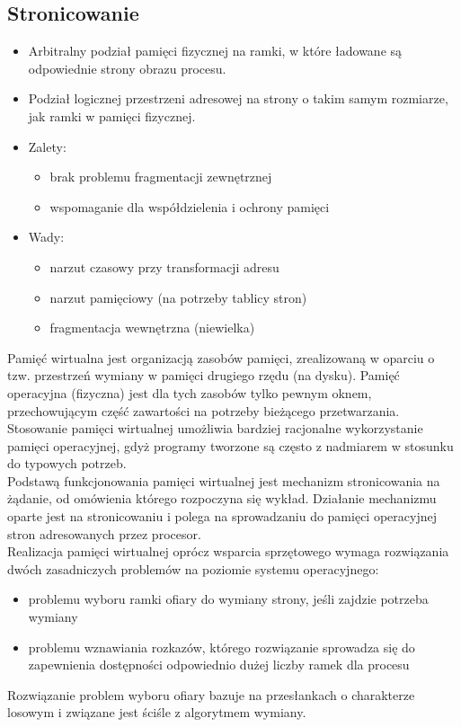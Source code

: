 \documentclass[main.tex]{subfiles}
\begin{document}
    \subsection{Stronicowanie}
    \begin{itemize}
        \item Arbitralny podział pamięci fizycznej na ramki, w które ładowane są odpowiednie strony obrazu procesu.
        \item Podział logicznej przestrzeni adresowej na strony o takim samym rozmiarze, jak ramki w pamięci fizycznej.
        \item Zalety:
        \begin{itemize}
            \item brak problemu fragmentacji zewnętrznej
            \item wspomaganie dla współdzielenia i ochrony pamięci
        \end{itemize}
        \item Wady:
        \begin{itemize}
            \item narzut czasowy przy transformacji adresu
            \item narzut pamięciowy (na potrzeby tablicy stron)
            \item fragmentacja wewnętrzna (niewielka)
        \end{itemize}
    \end{itemize}

    Pamięć wirtualna jest organizacją zasobów pamięci, zrealizowaną w oparciu o tzw. przestrzeń wymiany w pamięci drugiego rzędu (na dysku). Pamięć operacyjna (fizyczna) jest dla tych zasobów tylko pewnym oknem, przechowującym część zawartości na potrzeby bieżącego przetwarzania. Stosowanie pamięci wirtualnej umożliwia bardziej racjonalne wykorzystanie pamięci operacyjnej, gdyż programy tworzone są często z nadmiarem w stosunku do typowych potrzeb.
    \\
    Podstawą funkcjonowania pamięci wirtualnej jest mechanizm stronicowania na żądanie, od omówienia którego rozpoczyna się
    wykład. Działanie mechanizmu oparte jest na stronicowaniu i polega na sprowadzaniu do pamięci operacyjnej stron adresowanych przez procesor.
    \\
    Realizacja pamięci wirtualnej oprócz wsparcia sprzętowego
    wymaga rozwiązania dwóch zasadniczych problemów na poziomie systemu operacyjnego:
    \begin{itemize}
        \item problemu wyboru ramki ofiary do wymiany strony, jeśli zajdzie potrzeba wymiany
        \item problemu wznawiania rozkazów, którego rozwiązanie sprowadza się do zapewnienia dostępności odpowiednio dużej liczby ramek dla procesu
    \end{itemize}
    Rozwiązanie problem wyboru ofiary bazuje na przesłankach o charakterze losowym i związane jest ściśle z algorytmem wymiany.
    \\
\end{document}

